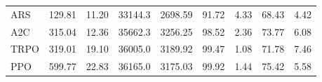 \begin{samepage}
\begin{center}
\begin{tabular}{l|rr|rr|rr|rr}
    ARS          &   129.81 &    11.20 &    33144.3 &    2698.59 &   91.72 &    4.33 &   68.43 &    4.42 \\
    A2C          &   315.04 &    12.36 &    35662.3 &    3256.25 &   98.52 &    2.36 &   73.77 &    6.08 \\
    TRPO         &   319.01 &    19.10 &    36005.0 &    3189.92 &   99.47 &    1.08 &   71.78 &    7.46 \\
    PPO          &   599.77 &    22.83 &    36165.0 &    3175.03 &   99.92 &    1.44 &   75.42 &    5.58 \\
    \bottomrule
  \end{tabular}
\end{center}
\end{samepage}

